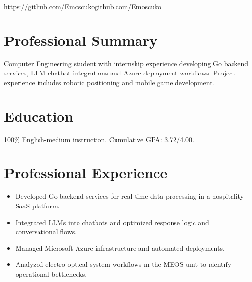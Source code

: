 \documentclass[10pt,a4paper]{article}
\begin{document}
  {https://github.com/Emoscuko}{github.com/Emoscuko}

\section{Professional Summary}
Computer Engineering student with internship experience developing Go backend services,
LLM chatbot integrations and Azure deployment workflows. Project experience includes
robotic positioning and mobile game development.

\section{Education}
100\% English-medium instruction. Cumulative GPA: 3.72/4.00.

\section{Professional Experience}
\begin{itemize}
  \item Developed Go backend services for real-time data processing in a hospitality SaaS platform.
  \item Integrated LLMs into chatbots and optimized response logic and conversational flows.
  \item Managed Microsoft Azure infrastructure and automated deployments.
\end{itemize}

\begin{itemize}
  \item Analyzed electro-optical system workflows in the MEOS unit to identify operational bottlenecks.
\end{itemize}
\end{document}
